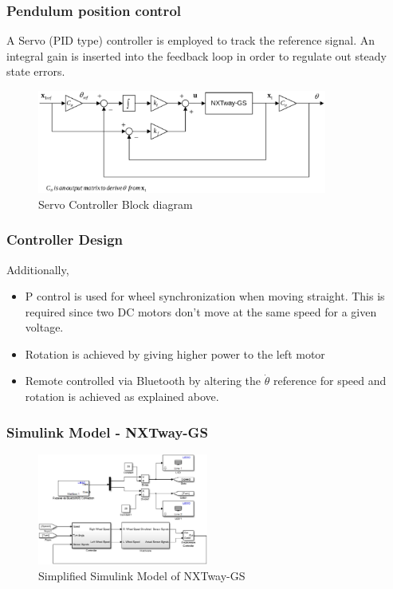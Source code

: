 \documentclass[aspectratio=169]{beamer}
\begin{document}
\begin{frame}
\frametitle{Pendulum position control}
A Servo (PID type) controller is employed to track the reference signal. An integral gain is inserted into the feedback loop in order to regulate out steady state errors. 

\begin{figure}
    \includegraphics[width=0.85\textwidth]{CtrlBlk.eps}
	\caption{Servo Controller Block diagram}
\end{figure}

\end{frame}


\begin{frame}
\frametitle{Controller Design}
Additionally,
\begin{itemize}
\item P control is used for wheel synchronization when moving straight. This is required since two DC motors don't move at the same speed for a given voltage.
\item Rotation is achieved by giving higher power to the left motor
\item Remote controlled via Bluetooth by altering the $\dot{\theta}$ reference for speed and rotation is achieved as explained above.
\end{itemize}
\end{frame}


\begin{frame}
\frametitle{Simulink Model - NXTway-GS}
\begin{figure}
	\includegraphics[width=0.5\textwidth]{smdlBot.eps}
	\caption{Simplified Simulink Model of NXTway-GS}
\end{figure}
\end{frame}
\end{document}
